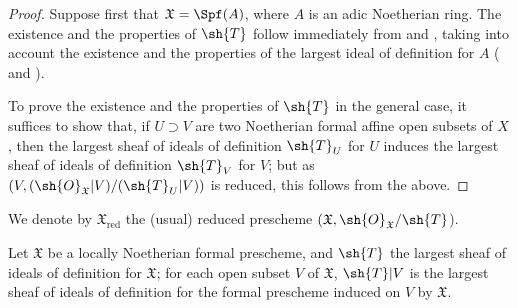 \begin{proof}
Suppose first that $\mathfrak{X}=\Spf(A)$, where $A$ is an adic Noetherian ring.
The existence and the properties of $\sh{T}$ follow immediately from   and , taking into account the existence and the properties of the largest ideal of definition for $A$ ( and ).

To prove the existence and the properties of $\sh{T}$ in the general case, it suffices to show that, if $U\supset V$ are two Noetherian formal affine open subsets of $X$, then the largest sheaf of ideals of definition $\sh{T}_U$ for $U$ induces the largest sheaf of ideals of definition $\sh{T}_V$ for $V$; but as $(V,(\sh{O}_\mathfrak{X}|V)/(\sh{T}_U|V))$ is reduced, this follows from the above.
\end{proof}

We denote by $\mathfrak{X}_\text{red}$ the (usual) reduced prescheme $(\mathfrak{X},\sh{O}_\mathfrak{X}/\sh{T}$).

\begin{corollary}[10.5.5]
\label{I.10.5.5}
Let $\mathfrak{X}$ be a locally Noetherian formal prescheme, and $\sh{T}$ the largest sheaf of ideals of definition for $\mathfrak{X}$; for each open subset $V$ of $\mathfrak{X}$, $\sh{T}|V$ is the largest sheaf of ideals of definition for the formal prescheme induced on $V$ by $\mathfrak{X}$.
\end{corollary}


